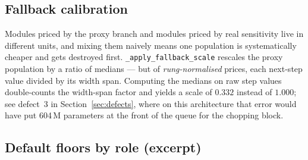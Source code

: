 \documentclass[11pt]{article}
\newcommand{\code}[1]{\texttt{#1}}
\begin{document}
\subsection{Fallback calibration}

Modules priced by the proxy branch and modules priced by real sensitivity live in different
units, and mixing them naively means one population is systematically cheaper and gets destroyed
first. \code{\_apply\_fallback\_scale} rescales the proxy population by a ratio of medians ---
but of \emph{rung-normalised} prices, each next-step value divided by its width span. Computing
the medians on raw step values double-counts the width-span factor and yields a scale of
$0.332$ instead of $1.000$; see defect~3 in Section~\ref{sec:defects}, where on this
architecture that error would have put 604\,M parameters at the front of the queue for the
chopping block.

\subsection{Default floors by role (excerpt)}
\end{document}
